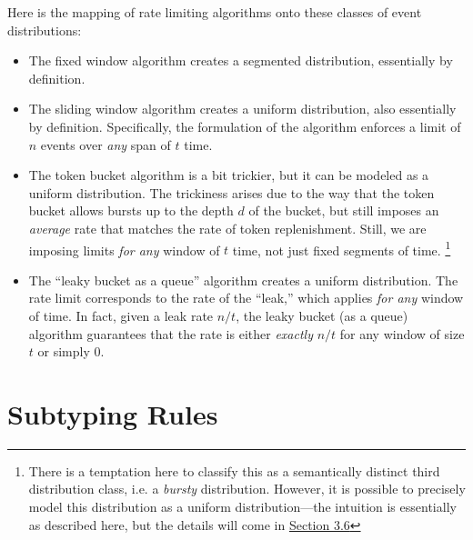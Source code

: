 \documentclass[acmsmall,nonacm,screen]{acmart}
\begin{document}
Here is the mapping of rate limiting algorithms onto these classes of event distributions:
\begin{itemize}
  \item The fixed window algorithm creates a segmented distribution, essentially by definition.
  \item The sliding window algorithm creates a uniform distribution, also essentially by definition. Specifically, the formulation of the algorithm enforces a limit of $n$ events over \textit{any} span of $t$ time.
  \item The token bucket algorithm is a bit trickier, but it can be modeled as a uniform distribution. The trickiness arises due to the way that the token bucket allows bursts up to the depth $d$ of the bucket, but still imposes an \textit{average} rate that matches the rate of token replenishment. Still, we are imposing limits \textit{for any} window of $t$ time, not just fixed segments of time. \footnote{There is a temptation here to classify this as a semantically distinct third distribution class, i.e. a \textit{bursty} distribution. However, it is possible to precisely model this distribution as a uniform distribution—the intuition is essentially as described here, but the details will come in \hyperlink{section.3}{Section 3.6}}
  \item The ``leaky bucket as a queue'' algorithm creates a uniform distribution. The rate limit corresponds to the rate of the ``leak,'' which applies \textit{for any} window of time. In fact, given a leak rate $n/t$, the leaky bucket (as a queue) algorithm guarantees that the rate is either \textit{exactly} $n/t$ for any window of size $t$ or simply $0$.
\end{itemize}

\section{Subtyping Rules}
\end{document}
